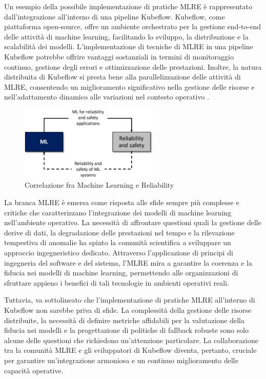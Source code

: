 Un esempio della possibile implementazione di pratiche MLRE è rappresentato dall'integrazione all'interno di una pipeline Kubeflow. Kubeflow, come piattaforma open-source, offre un ambiente orchestrato per la gestione end-to-end delle attività di machine learning, facilitando lo sviluppo, la distribuzione e la scalabilità dei modelli. L'implementazione di tecniche di MLRE in una pipeline Kubeflow potrebbe offrire vantaggi sostanziali in termini di monitoraggio continuo, gestione degli errori e ottimizzazione delle prestazioni. Inoltre, la natura distribuita di Kubeflow si presta bene alla parallelizzazione delle attività di MLRE, consentendo un miglioramento significativo nella gestione delle risorse e nell'adattamento dinamico alle variazioni nel contesto operativo \cite{Kubeflow_integration}.

\begin{figure}[h]
    \centering
    \includegraphics[width=250px]{figures/ch6/mlre.png}
    \caption[Correlazione fra Machine Learning e Reliability]{Correlazione fra Machine Learning e Reliability}
    \label{fig:cha6:mlre}
\end{figure}

La branca MLRE è emersa come risposta alle sfide sempre più complesse e critiche che caratterizzano l'integrazione dei modelli di machine learning nell'ambiente operativo. La necessità di affrontare questioni quali la gestione delle derive di dati, la degradazione delle prestazioni nel tempo e la rilevazione tempestiva di anomalie ha spinto la comunità scientifica a sviluppare un approccio ingegneristico dedicato. Attraverso l'applicazione di principi di ingegneria del software e del sistema, l'MLRE mira a garantire la coerenza e la fiducia nei modelli di machine learning, permettendo alle organizzazioni di sfruttare appieno i benefici di tali tecnologie in ambienti operativi reali.

Tuttavia, va sottolineato che l'implementazione di pratiche MLRE all'interno di Kubeflow non sarebbe priva di sfide. La complessità della gestione delle risorse distribuite, la necessità di definire metriche affidabili per la valutazione della fiducia nei modelli e la progettazione di politiche di fallback robuste sono solo alcune delle questioni che richiedono un'attenzione particolare. La collaborazione tra la comunità MLRE e gli sviluppatori di Kubeflow diventa, pertanto, cruciale per garantire un'integrazione armoniosa e un continuo miglioramento delle capacità operative.

